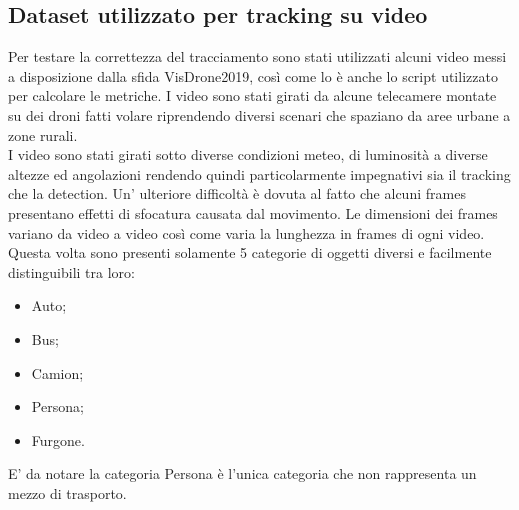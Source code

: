 \subsection{Dataset utilizzato per tracking su video}
Per testare la correttezza del tracciamento sono stati utilizzati alcuni video messi a disposizione dalla sfida VisDrone2019, così come lo è anche lo script utilizzato per calcolare le metriche. I video sono stati girati da alcune telecamere montate su dei droni fatti volare riprendendo diversi scenari che spaziano da aree urbane a zone rurali.\\
I video sono stati girati sotto diverse condizioni meteo, di luminosità a diverse altezze ed angolazioni rendendo quindi particolarmente impegnativi sia il tracking che la detection. Un' ulteriore difficoltà è dovuta al fatto che alcuni frames presentano effetti di sfocatura causata dal movimento. Le dimensioni dei frames variano da video a video così come varia la lunghezza in frames di ogni video. Questa volta sono presenti solamente 5 categorie di oggetti diversi e facilmente distinguibili tra loro:
\begin{itemize}
\item Auto;
\item Bus;
\item Camion;
\item Persona;
\item Furgone.
\end{itemize}
E' da notare la categoria Persona è l'unica categoria che non rappresenta un mezzo di trasporto.

